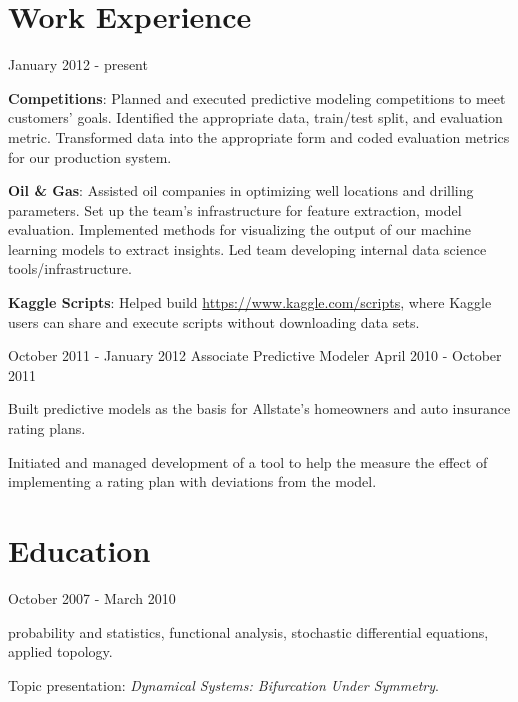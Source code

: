 \documentclass[letterpaper]{resume}
\author{David J. Chudzicki}
\begin{document}
\maketitle

\section{Work Experience}

{January 2012 - present}            


\begin{compactitem}
\item \textbf{Competitions}: Planned and executed predictive modeling competitions to meet customers' goals. Identified the appropriate data, train/test split, and evaluation metric. Transformed data into the appropriate form and coded evaluation metrics for our production system.
\item \textbf{Oil \& Gas}: Assisted oil companies in optimizing well locations and drilling parameters. Set up the team's infrastructure for feature extraction, model evaluation. Implemented methods for visualizing the output of our machine learning models to extract insights. Led team developing internal data science tools/infrastructure.
\item \textbf{Kaggle Scripts}: Helped build \href{https://www.kaggle.com/scripts}{https://www.kaggle.com/scripts}, where Kaggle users can share and execute scripts without downloading data sets.
\end{compactitem}


{October 2011 - January 2012}
{Associate Predictive Modeler}
{April 2010 - October 2011}


\begin{compactitem}
\item Built predictive models as the basis for Allstate's homeowners and auto insurance rating plans.
\item Initiated and managed development of a tool to help the measure the effect of implementing a rating plan with deviations from the model.
\end{compactitem}

\section{Education}

{October 2007 - March 2010}
{}
{}
\begin{compactitem}
\item probability and statistics, functional analysis, stochastic differential equations, applied topology.
\item Topic presentation: \textit{Dynamical Systems: Bifurcation Under Symmetry}.      
\end{compactitem}
\end{document}
